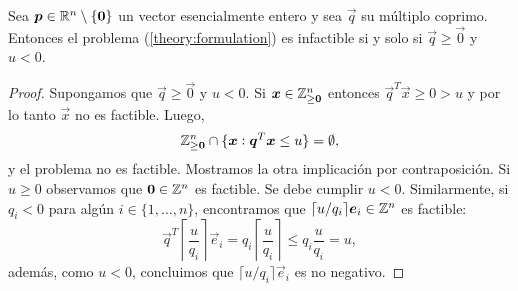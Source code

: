 \begin{theorem}
	\label{theory:th:infeasibility}
	Sea $\boldsymbol{p} \in \mathbb{R}^n \setminus \lbrace \boldsymbol{0} \rbrace $ un vector esencialmente entero y sea
	$\vec{q}$ su múltiplo coprimo. Entonces el problema (\ref{theory:formulation}) es infactible si
	y solo si $\vec{q} \geq \vec{0}$ y $u < 0$.
\end{theorem}
\begin{proof}
	Supongamos que $\vec{q} \geq \vec{0}$ y $u < 0$. Si $\boldsymbol{x} \in \mathbb{Z}_{\geq \boldsymbol{0}}^n$
	entonces $\vec{q}^T\vec{x} \geq 0 > u$ y por lo tanto $\vec{x}$ no es factible. Luego,
	\begin{equation*}
		\mathbb{Z}_{\geq \boldsymbol{0}}^{n} \cap \lbrace \boldsymbol{x} \vcentcolon \boldsymbol{q}^T\boldsymbol{x} 
		\leq u \rbrace = \emptyset,
	\end{equation*}
	y el problema no es factible. Mostramos la otra implicación por contraposición. Si $u
	\geq 0$ observamos que $\boldsymbol{0} \in \mathbb{Z}^n$ es factible. Se debe cumplir $u < 0$. Similarmente, si
	$q_i < 0$ para algún $i \in \lbrace 1, \ldots, n \rbrace$, encontramos que $\lceil u/q_i
	\rceil\boldsymbol{e}_i \in \mathbb{Z}^n$ es factible:
	\begin{equation*}
		\vec{q}^T\left\lceil \frac{u}{q_i} \right\rceil\vec{e}_i
		= q_i \left\lceil \frac{u}{q_i} \right\rceil
		\leq q_i \frac{u}{q_i} = u,
	\end{equation*}
	además, como $u < 0$, concluimos que $\lceil u/q_i \rceil\vec{e}_i$ es no negativo.
\end{proof}

